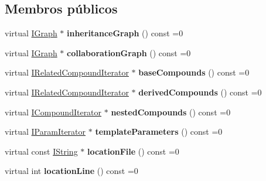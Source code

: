\subsection*{Membros públicos}
\begin{DoxyCompactItemize}
\item 
\hypertarget{class_i_class_aa0f48f4f6f602c735b956bdb9a921169}{virtual \hyperlink{class_i_graph}{I\-Graph} $\ast$ {\bfseries inheritance\-Graph} () const =0}\label{class_i_class_aa0f48f4f6f602c735b956bdb9a921169}

\item 
\hypertarget{class_i_class_ac0a8903f0c46ce72a0fab09c752bb295}{virtual \hyperlink{class_i_graph}{I\-Graph} $\ast$ {\bfseries collaboration\-Graph} () const =0}\label{class_i_class_ac0a8903f0c46ce72a0fab09c752bb295}

\item 
\hypertarget{class_i_class_a226f8a714bede3ebbac649e35dee67f1}{virtual \hyperlink{class_i_related_compound_iterator}{I\-Related\-Compound\-Iterator} $\ast$ {\bfseries base\-Compounds} () const =0}\label{class_i_class_a226f8a714bede3ebbac649e35dee67f1}

\item 
\hypertarget{class_i_class_a90c089115e36f8a84f78d172a249a4fd}{virtual \hyperlink{class_i_related_compound_iterator}{I\-Related\-Compound\-Iterator} $\ast$ {\bfseries derived\-Compounds} () const =0}\label{class_i_class_a90c089115e36f8a84f78d172a249a4fd}

\item 
\hypertarget{class_i_class_a6a1aab20f15a204af0b8d3e8470817bd}{virtual \hyperlink{class_i_compound_iterator}{I\-Compound\-Iterator} $\ast$ {\bfseries nested\-Compounds} () const =0}\label{class_i_class_a6a1aab20f15a204af0b8d3e8470817bd}

\item 
\hypertarget{class_i_class_a833b65bb6ef7e77fad6519309499d2ac}{virtual \hyperlink{class_i_param_iterator}{I\-Param\-Iterator} $\ast$ {\bfseries template\-Parameters} () const =0}\label{class_i_class_a833b65bb6ef7e77fad6519309499d2ac}

\item 
\hypertarget{class_i_class_a379530604a2eb817e4d46a9f70cd08cb}{virtual const \hyperlink{class_i_string}{I\-String} $\ast$ {\bfseries location\-File} () const =0}\label{class_i_class_a379530604a2eb817e4d46a9f70cd08cb}

\item 
\hypertarget{class_i_class_a47cd57dc825961bb4dad2ef542bd036c}{virtual int {\bfseries location\-Line} () const =0}\label{class_i_class_a47cd57dc825961bb4dad2ef542bd036c}


\end{DoxyCompactItemize}
